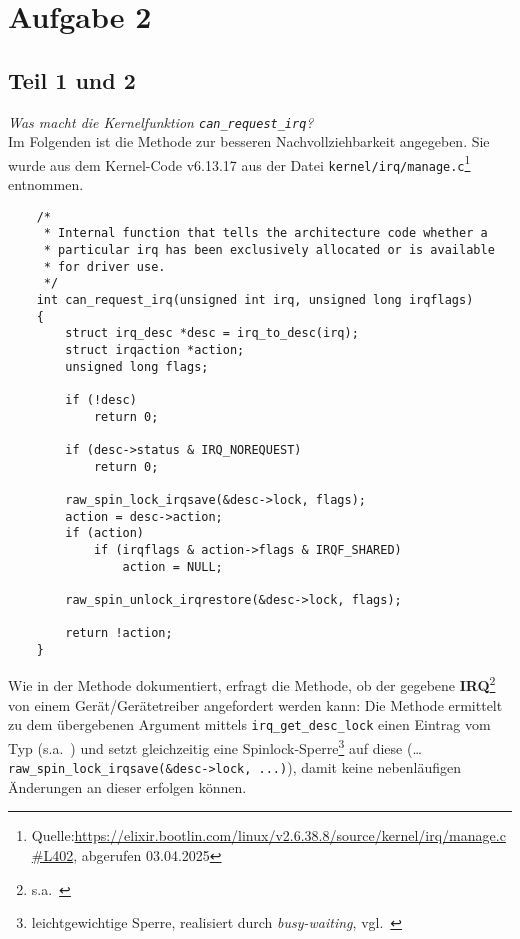 \chapter{Aufgabe 2}

\section{Teil 1 und 2}

\textit{Was macht die Kernelfunktion \texttt{can\_request\_irq}?}\\

\noindent
Im Folgenden ist die Methode zur besseren Nachvollziehbarkeit angegeben.
Sie wurde aus dem Kernel-Code v6.13.17 aus der Datei \texttt{kernel/irq/manage.c}\footnote{
Quelle:\url{https://elixir.bootlin.com/linux/v2.6.38.8/source/kernel/irq/manage.c#L402}, abgerufen 03.04.2025
} entnommen.\\

\begin{verbatim}
    /*
     * Internal function that tells the architecture code whether a
     * particular irq has been exclusively allocated or is available
     * for driver use.
     */
    int can_request_irq(unsigned int irq, unsigned long irqflags)
    {
        struct irq_desc *desc = irq_to_desc(irq);
        struct irqaction *action;
        unsigned long flags;

        if (!desc)
            return 0;

        if (desc->status & IRQ_NOREQUEST)
            return 0;

        raw_spin_lock_irqsave(&desc->lock, flags);
        action = desc->action;
        if (action)
            if (irqflags & action->flags & IRQF_SHARED)
                action = NULL;

        raw_spin_unlock_irqrestore(&desc->lock, flags);

        return !action;
    }
\end{verbatim}

\noindent
Wie in der Methode dokumentiert, erfragt die Methode, ob der gegebene \textbf{IRQ}\footnote{s.a.~\cite[52]{Man20d}} von einem Gerät/Gerätetreiber angefordert werden kann: Die Methode ermittelt zu dem übergebenen Argument  mittels \texttt{irq\_get\_desc\_lock} einen Eintrag vom Typ  (s.a.~\cite[64 f.]{Man20d}) und setzt gleichzeitig eine Spinlock-Sperre\footnote{
    leichtgewichtige Sperre, realisiert durch \textit{busy-waiting}, vgl.~\cite[150]{Man20g}
} auf diese  (\ldots \texttt{raw\_spin\_lock\_irqsave(&desc->lock, ...)}), damit keine nebenläufigen Änderungen an dieser erfolgen können.\\

